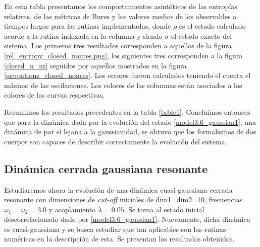 \documentclass{report} %
\numberwithin{equation}{section}
\begin{document}
\begin{table}
    \begin{tablenotes}
      \small
      \item En esta tabla presentamos los comportamientos asintóticos de las entropías relativas, de las métricas de Bures y los valores medios de los observables a tiempos largos para las rutinas implementadas, donde $\rho$ es el estado calculado acorde a la rutina indexada en la columna y siendo $\sigma$ el estado exacto del sistema. Los primeros tres resultados corresponden a aquellos de la figura \ref{rel_entropy_closed_nonres.png}, los siguientes tres corresponden a la figura \ref{closed_n_nr} seguidos por aquellos mostrados en la figura \ref{ocupations_closed_nonres}. Los errores fueron calculados teniendo el cuenta el máximo de las oscilaciones. Los colores de las columnas están asociados a los colores de las curvas respectivas. 
    \end{tablenotes}
    \label{table1}
\end{table}

Resumimos los resultados precedentes en la tabla \ref{table1}. Concluímos entonces que para la dinámica dada por la evolución del estado \eqref{model3.6_gaussian1}, una dinámica de por sí lejana a la gaussianidad, se obtuvo que los formalismos de dos cuerpos son capaces de describir correctamente la evolución del sistema.

\subsection{Dinámica cerrada gaussiana resonante}
\label{bxb_cr}

Estudiaremos ahora la evolución de una dinámica cuasi gaussiana cerrada resonante con dimensiones de \textit{cut-off} iniciales de dim1=dim2=10, frecuencias $\omega_1 = \omega_2 = 3.0$ y acoplamiento $\lambda = 0.05$. Se toma al estado inicial descorrelacionado dado por \eqref{model3.6_gaussian1}. Nuevamente, dicha dinámica es cuasi-gaussiana y se busca estudiar que tan aplicables son las rutinas numéricas en la descripción de esta. Se presentan los resultados obtenidos. 
\end{document}
